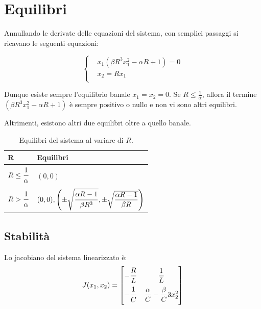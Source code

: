 \section{Equilibri}
Annullando le derivate delle equazioni del sistema, con semplici passaggi si ricavano le seguenti equazioni:

\begin{equation}
\left\{
\begin{aligned}
    &x_1 ( \beta R^3 x_1^2 - \alpha R + 1) = 0\\
    &x_2 = R x_1\\
\end{aligned}
\right.
\end{equation}

Dunque esiste sempre l'equilibrio banale $x_1 = x_2 = 0$.
Se $R \le \frac{1}{\alpha}$, allora il termine $( \beta R^3 x_1^2 - \alpha R + 1)$ è sempre positivo o nullo e non vi sono altri equilibri.

Altrimenti, esistono altri due equilibri oltre a quello banale.

\begin{table}[h]
\begin{center}
    \begin{tabular}{l | l}
        \textbf{R} & \textbf{Equilibri}\\
        \hline
        $R \le \dfrac{\strut 1}{\strut\alpha}$ & $(0, 0)$\\
        $R > \dfrac{\strut 1}{\strut\alpha}$ & $(0,0),
        \left( \pm \sqrt{\dfrac{\strut\alpha R -1}{\strut\beta R^3}}, \pm \sqrt{\dfrac{\alpha R -1}{\beta R}} \right)$
    \end{tabular}
\end{center}
\caption{Equilibri del sistema al variare di $R$.}
\end{table}

\subsection{Stabilità}
Lo jacobiano del sistema linearizzato è:
\begin{equation}
J(x_1,x_2) =
\begin{bmatrix}
-\dfrac{\strut R}{L\strut} & \dfrac{1}{L} \\
-\dfrac{\strut 1}{C\strut} & \dfrac{\alpha}{C}-\dfrac{\beta}{C} 3x_2^2 \\
\end{bmatrix}
\end{equation}

